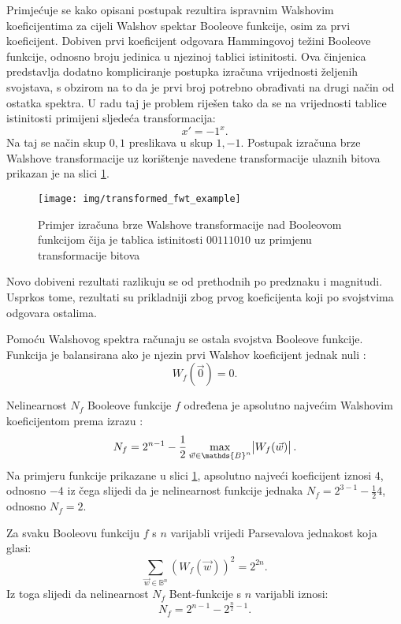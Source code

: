 Primjećuje se kako opisani postupak rezultira ispravnim Walshovim koeficijentima za cijeli Walshov spektar Booleove funkcije, osim za prvi koeficijent.
Dobiven prvi koeficijent odgovara Hammingovoj težini Booleove funkcije, odnosno broju jedinica u njezinoj tablici istinitosti.
Ova činjenica predstavlja dodatno kompliciranje postupka izračuna vrijednosti željenih svojstava, s obzirom na to da je prvi broj potrebno obrađivati na drugi način od ostatka spektra.
U radu \cite{MeasuringBoolean} taj je problem riješen tako da se na vrijednosti tablice istinitosti primijeni sljedeća transformacija:
\begin{equation}
    x' = -1^x.
\end{equation}
Na taj se način skup ${0, 1}$ preslikava u skup ${1, -1}$.
Postupak izračuna brze Walshove transformacije uz korištenje navedene transformacije ulaznih bitova prikazan je na slici \ref{fig:transformed_fwt_example}.
\begin{figure}[ht!] 
    \centering
    \texttt{[image: img/transformed\_fwt\_example]}
    \captionsetup{justification=centering}
    \caption{Primjer izračuna brze Walshove transformacije nad Booleovom funkcijom čija je tablica istinitosti $00111010$ uz primjenu transformacije bitova}
    \label{fig:transformed_fwt_example}
\end{figure}
Novo dobiveni rezultati razlikuju se od prethodnih po predznaku i magnitudi.
Usprkos tome, rezultati su prikladniji zbog prvog koeficijenta koji po svojstvima odgovara ostalima.

Pomoću Walshovog spektra računaju se ostala svojstva Booleove funkcije.
Funkcija je balansirana ako je njezin prvi Walshov koeficijent jednak nuli \cite{MaximalNonlinearity}:
\begin{equation}
    W_f(\vec{0}) = 0.
\end{equation} 

Nelinearnost $N_f$ Booleove funkcije $f$ određena je apsolutno najvećim Walshovim koeficijentom prema izrazu \cite{MaximalNonlinearity}:
\begin{equation}
    N_f = 2^{n-1} - \frac{1}{2}\max_{\vec{w} \in \mathds{B}^n} \abs{W_f(\vec{w})}.
\end{equation}
Na primjeru funkcije prikazane u slici \ref{fig:transformed_fwt_example}, apsolutno najveći koeficijent iznosi $4$, odnosno $-4$ iz čega slijedi da je nelinearnost funkcije jednaka $N_f = 2^{3-1} - \frac{1}{2}4$, odnosno $N_f = 2$.

Za svaku Booleovu funkciju $f$ s $n$ varijabli vrijedi Parsevalova jednakost koja glasi:
\begin{equation}
    \sum_{\vec{w}\in \mathds{B}^n} \left( W_f(\vec{w}) \right)^2 = 2^{2n}.
\end{equation} 
Iz toga slijedi da nelinearnost $N_f$ Bent-funkcije s $n$ varijabli iznosi:
\begin{equation}
    N_f = 2^{n-1} - 2^{\frac{n}{2}-1}.
\end{equation}